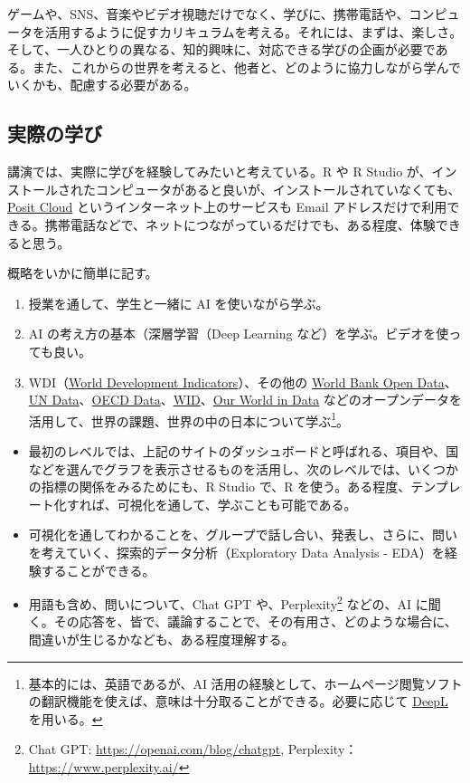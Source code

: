 \documentclass[
]{bxjsbook}
\providecommand{\tightlist}{%
  \setlength{\itemsep}{0pt}\setlength{\parskip}{0pt}}
\theoremstyle{definition}
\theoremstyle{definition}
\theoremstyle{definition}
\theoremstyle{definition}
\theoremstyle{remark}
\begin{document}
ゲームや、SNS、音楽やビデオ視聴だけでなく、学びに、携帯電話や、コンピュータを活用するように促すカリキュラムを考える。それには、まずは、楽しさ。そして、一人ひとりの異なる、知的興味に、対応できる学びの企画が必要である。また、これからの世界を考えると、他者と、どのように協力しながら学んでいくかも、配慮する必要がある。

\hypertarget{ux5b9fux969bux306eux5b66ux3073}{%
\subsection{実際の学び}\label{ux5b9fux969bux306eux5b66ux3073}}

講演では、実際に学びを経験してみたいと考えている。R や R Studio が、インストールされたコンピュータがあると良いが、インストールされていなくても、\href{https://posit.cloud/}{Posit Cloud} というインターネット上のサービスも Email アドレスだけで利用できる。携帯電話などで、ネットにつながっているだけでも、ある程度、体験できると思う。

概略をいかに簡単に記す。

\begin{enumerate}
\def\labelenumi{\arabic{enumi}.}
\tightlist
\item
  授業を通して、学生と一緒に AI を使いながら学ぶ。
\item
  AI の考え方の基本（深層学習（Deep Learning など）を学ぶ。ビデオを使っても良い。
\item
  WDI（\href{https://datatopics.worldbank.org/world-development-indicators/}{World Development Indicators}）、その他の \href{https://data.worldbank.org/}{World Bank Open Data}、\href{https://data.un.org/}{UN Data}、\href{https://data.oecd.org/}{OECD Data}、\href{https://wid.world/}{WID}、\href{https://ourworldindata.org/}{Our World in Data} などのオープンデータを活用して、世界の課題、世界の中の日本について学ぶ\footnote{基本的には、英語であるが、AI 活用の経験として、ホームページ閲覧ソフトの翻訳機能を使えば、意味は十分取ることができる。必要に応じて \href{https://www.deepl.com/en/translator}{DeepL} を用いる。}。
\end{enumerate}

\begin{itemize}
\tightlist
\item
  最初のレベルでは、上記のサイトのダッシュボードと呼ばれる、項目や、国などを選んでグラフを表示させるものを活用し、次のレベルでは、いくつかの指標の関係をみるためにも、R Studio で、R を使う。ある程度、テンプレート化すれば、可視化を通して、学ぶことも可能である。
\item
  可視化を通してわかることを、グループで話し合い、発表し、さらに、問いを考えていく、探索的データ分析（Exploratory Data Analysis - EDA）を経験することができる。
\item
  用語も含め、問いについて、Chat GPT や、Perplexity\footnote{Chat GPT: \url{https://openai.com/blog/chatgpt}, Perplexity：\url{https://www.perplexity.ai/}} などの、AI に聞く。その応答を、皆で、議論することで、その有用さ、どのような場合に、間違いが生じるかなども、ある程度理解する。
\end{itemize}
\end{document}

